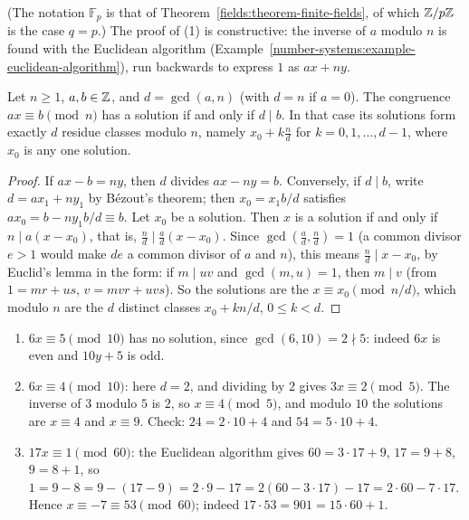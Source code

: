 (The notation $\mathbb{F}_p$ is that of Theorem~\ref{fields:theorem-finite-fields}, of which $\mathbb{Z}/p\mathbb{Z}$ is the case $q = p$.) The proof of (1) is constructive: the inverse of $a$ modulo $n$ is found with the
Euclidean algorithm (Example~\ref{number-systems:example-euclidean-algorithm}), run backwards to express $1$ as $ax + ny$.

\begin{proposition}\label{number-theory:proposition-linear-congruence}
Let $n \geq 1$, $a, b \in \mathbb{Z}$, and $d = \gcd(a, n)$ (with $d = n$ if $a = 0$). The congruence $ax \equiv b \pmod n$ has a solution if and only if $d \mid b$. In that case its solutions form exactly $d$
residue classes modulo $n$, namely $x_0 + k\frac{n}{d}$ for $k = 0, 1, \ldots, d - 1$, where $x_0$ is any one solution.
\end{proposition}

\begin{proof}
If $ax - b = ny$, then $d$ divides $ax - ny = b$. Conversely, if $d \mid b$, write $d = ax_1 + ny_1$ by B\'ezout's theorem; then $x_0 = x_1b/d$ satisfies $ax_0 = b - ny_1b/d \equiv b$. Let $x_0$ be a
solution. Then $x$ is a solution if and only if $n \mid a(x - x_0)$, that is, $\frac{n}{d} \mid \frac{a}{d}(x - x_0)$. Since $\gcd(\frac{a}{d}, \frac{n}{d}) = 1$ (a common divisor $e > 1$ would make $de$
a common divisor of $a$ and $n$), this means $\frac{n}{d} \mid x - x_0$, by Euclid's lemma in the form: if $m \mid uv$ and $\gcd(m, u) = 1$, then $m \mid v$ (from $1 = mr + us$, $v = mvr + uvs$). So the
solutions are the $x \equiv x_0 \pmod{n/d}$, which modulo $n$ are the $d$ distinct classes $x_0 + kn/d$, $0 \leq k < d$.
\end{proof}

\begin{example}\label{number-theory:example-linear-congruence}
\begin{enumerate}
\item $6x \equiv 5 \pmod{10}$ has no solution, since $\gcd(6, 10) = 2 \nmid 5$: indeed $6x$ is even and $10y + 5$ is odd.
\item $6x \equiv 4 \pmod{10}$: here $d = 2$, and dividing by $2$ gives $3x \equiv 2 \pmod 5$. The inverse of $3$ modulo $5$ is $2$, so $x \equiv 4 \pmod 5$, and modulo $10$ the solutions are $x \equiv 4$
and $x \equiv 9$. Check: $24 = 2 \cdot 10 + 4$ and $54 = 5 \cdot 10 + 4$.
\item $17x \equiv 1 \pmod{60}$: the Euclidean algorithm gives $60 = 3 \cdot 17 + 9$, $17 = 9 + 8$, $9 = 8 + 1$, so $1 = 9 - 8 = 9 - (17 - 9) = 2 \cdot 9 - 17 = 2(60 - 3 \cdot 17) - 17 = 2 \cdot 60 - 7 \cdot 17$.
Hence $x \equiv -7 \equiv 53 \pmod{60}$; indeed $17 \cdot 53 = 901 = 15 \cdot 60 + 1$.
\end{enumerate}
\end{example}

